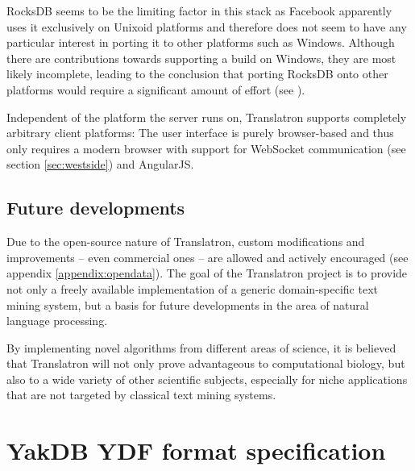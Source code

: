 \documentclass[a4paper, 12pt, twoside, reqn]{report}
\numberwithin{figure}{chapter}
\newtheorem[L]{boxedDefinition}{Definition}
\newtheorem[L]{boxedExample}{Example}
\begin{document}
RocksDB seems to be the limiting factor in this stack as Facebook apparently uses it exclusively on Unixoid platforms and therefore does not seem to have any particular interest in porting it to other platforms such as Windows. Although there are contributions towards supporting a build on Windows, they are most likely incomplete, leading to the conclusion that porting RocksDB onto other platforms would require a significant amount of effort (see \cite{rocksdb-windows}).

Independent of the platform the server runs on, Translatron supports completely arbitrary client platforms: The user interface is purely browser-based and thus only requires a modern browser with support for WebSocket communication (see section \ref{sec:westside}) and AngularJS.

\section{Future developments}

Due to the open-source nature of Translatron, custom modifications and improvements -- even commercial ones -- are allowed and actively encouraged (see appendix \ref{appendix:opendata}). The goal of the Translatron project is to provide not only a freely available implementation of a generic domain-specific text mining system, but a basis for future developments in the area of natural language processing.

By implementing novel algorithms from different areas of science, it is believed that Translatron will not only prove advantageous to computational biology, but also to a wide variety of other scientific subjects, especially for niche applications that are not targeted by classical text mining systems.

\appendix

\listoffigures

\newpage

%



\chapter{YakDB YDF format specification}\label{appendix:ydf}
\end{document}
